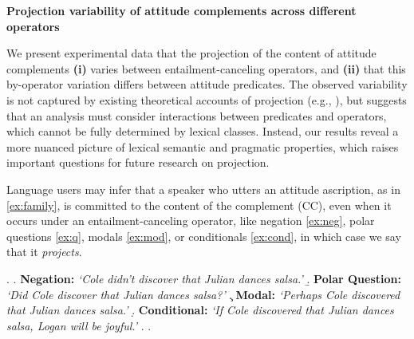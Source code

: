 \documentclass[12pt, a4paper]{article}
\begin{document}


\begin{center}
	\textbf{\large%
		Projection variability of attitude complements across different operators}
\end{center}

\vspace{-.7\baselineskip}
\noindent 
	We present experimental data that the projection of the content of attitude complements \textbf{(i)} varies between entailment-canceling operators, and \textbf{(ii)} that this by-operator variation differs between attitude predicates.
	The observed variability is not captured by existing theoretical accounts of projection
	(e.g., \citealt{heim_projection_1983,van_der_sandt_presupposition_1992,abrusan_predicting_2011,schlenker_triggering_2021}), but suggests that an analysis must consider interactions between predicates and operators, which cannot be fully determined by lexical classes. Instead, our results reveal a more nuanced picture of lexical semantic and pragmatic properties, which raises important questions for future research on projection.
	
	Language users may infer that a speaker who utters an attitude ascription, as in \ref{ex:family}, is committed to the content of the complement (CC),
	even when it occurs under an entailment-canceling operator, like negation \ref{ex:neg}, polar questions \ref{ex:q}, modals \ref{ex:mod}, or conditionals \ref{ex:cond}, in which case we say that it \emph{projects}.

	\vspace{-.5\baselineskip}
	\ex. \label{ex:family}
		\a. \label{ex:neg}
			{\bf Negation:} \hfill
			\emph{\lq Cole didn't discover that Julian dances salsa.\rq}
		\b. \label{ex:q}
			{\bf Polar Question:} \hfill
			\emph{\lq Did Cole discover that Julian dances salsa?\rq}
		\c. \label{ex:mod}
			{\bf Modal:} \hfill
			\emph{\lq Perhaps Cole discovered that Julian dances salsa.\rq}
		\d. \label{ex:cond}
			{\bf Conditional:} \hfill
			\emph{\lq If Cole discovered that Julian dances salsa, Logan will be joyful.\rq}
		\z.
	\z.
	
\end{document}

